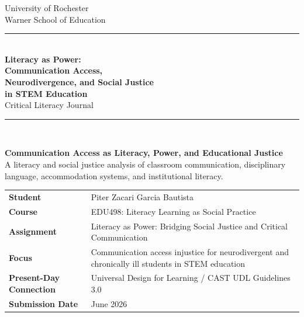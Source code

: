 \begin{titlepage}
\thispagestyle{empty}

\begin{center}
{\large University of Rochester\\}
{\normalsize Warner School of Education\\[0.35in]}

{\color{PrimaryRed}\rule{\textwidth}{1.4pt}}\\[0.22in]
{\Huge\bfseries Literacy as Power:\\[0.08in] Communication Access,\\[0.08in] Neurodivergence, and Social Justice\\[0.08in] in STEM Education}\\[0.18in]
{\Large Critical Literacy Journal}\\[0.22in]
{\color{PrimaryRed}\rule{0.78\textwidth}{0.7pt}}\\[0.32in]

\colorbox{SoftBlue}{%
\parbox{0.88\textwidth}{%
\centering\vspace{0.12in}
\textbf{Communication Access as Literacy, Power, and Educational Justice}\\[0.05in]
A literacy and social justice analysis of classroom communication, disciplinary language, accommodation systems, and institutional literacy.
\vspace{0.12in}
}%
}
\end{center}

\vspace{0.25in}

\begin{center}
\renewcommand{\arraystretch}{1.15}
\setlength{\tabcolsep}{4pt}
\begin{tabular}{>{\bfseries\RaggedLeft}p{1.65in} p{4.9in}}
Student & Piter Zacari Garcia Bautista \\
Course & EDU498: Literacy Learning as Social Practice \\
Assignment & Literacy as Power: Bridging Social Justice and Critical Communication \\
Focus & Communication access injustice for neurodivergent and chronically ill students in STEM education \\
Present-Day Connection & Universal Design for Learning / CAST UDL Guidelines 3.0 \\
Submission Date & June 2026 \\
\end{tabular}
\end{center}


\end{titlepage}
